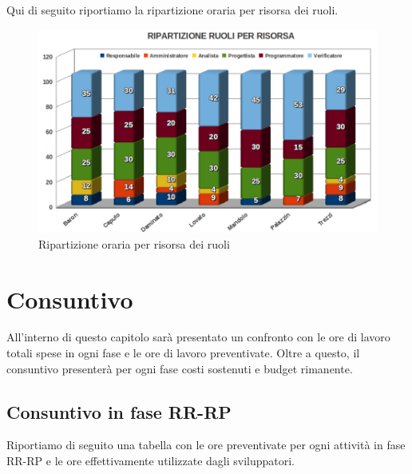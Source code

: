 Qui di seguito riportiamo la ripartizione oraria per risorsa dei ruoli.

\vspace{0cm}
\begin{figure}[htbp!]
  \centering
  \includegraphics[width=17.2cm, angle=0]{img/PP/RISORSE.png}
\caption{Ripartizione oraria per risorsa dei ruoli}
\end{figure}
\vspace{0.5cm}


\chapter{Consuntivo}

All'interno di questo capitolo sar\`a presentato un confronto con le ore di lavoro
totali spese in ogni fase e le ore di lavoro preventivate. Oltre a questo, il consuntivo 
presenter\`a per ogni fase costi sostenuti e budget rimanente.

\section{Consuntivo in fase RR-RP}

Riportiamo di seguito una tabella con le ore preventivate per ogni attivit\`a
in fase RR-RP e le ore effettivamente utilizzate dagli sviluppatori.

